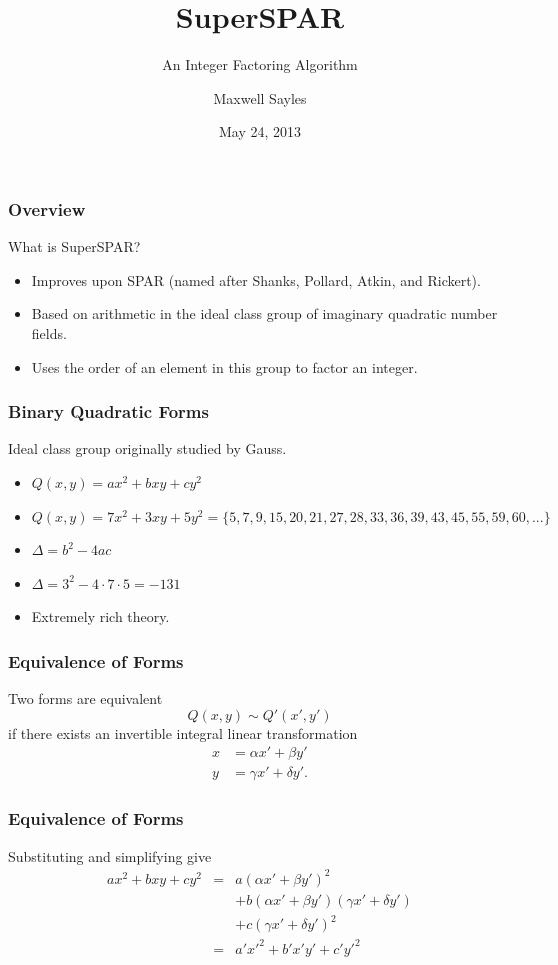 \documentclass{beamer}
\title[]{SuperSPAR}
\subtitle{An Integer Factoring Algorithm}
\author{Maxwell Sayles}
\date{May 24, 2013}
\institute{
	\bigskip 
       Department of Computer Science \\
       University of Calgary
}
\begin{document}
\maketitle

\begin{frame}
\frametitle{Overview}
What is SuperSPAR?
\begin{itemize}
\item Improves upon SPAR (named after Shanks, Pollard, Atkin, and Rickert).
\item Based on arithmetic in the ideal class group of imaginary quadratic number fields.
\item Uses the order of an element in this group to factor an integer.
\end{itemize}
\end{frame}

\begin{frame}
\frametitle{Binary Quadratic Forms}
Ideal class group originally studied by Gauss.
\begin{itemize}[<+->]
\item $Q(x, y) = ax^2 + bxy + cy^2$
\item $Q(x, y) = 7x^2 + 3xy + 5y^2 = \{5,7,9,15,20,21,27,28,33,36,39,43,45,55,59,60,...\}$
\item $\Delta = b^2 - 4ac$
\item $\Delta = 3^2 - 4 \cdot 7 \cdot 5 = -131$
\item Extremely rich theory.
\end{itemize}
\end{frame}

\begin{frame}
\frametitle{Equivalence of Forms}
Two forms are equivalent
\[
Q(x, y) \sim Q'(x',y')
\]
if there exists an invertible integral linear transformation
\begin{align*}
x &= \alpha x' + \beta y' \\
y &= \gamma x' + \delta y'.
\end{align*}
\end{frame}
\begin{frame}
\frametitle{Equivalence of Forms}
Substituting and simplifying give
\begin{eqnarray*}
ax^2 + bxy + cy^2
	&=& a(\alpha x' + \beta y')^2 \\
	&& + b(\alpha x' + \beta y')(\gamma x' + \delta y') \\
	&& + c(\gamma x' + \delta y')^2 \\
	&=& a'{x'}^2 + b'x'y' + c'{y'}^2
\end{eqnarray*}
\end{frame}
\end{document}
